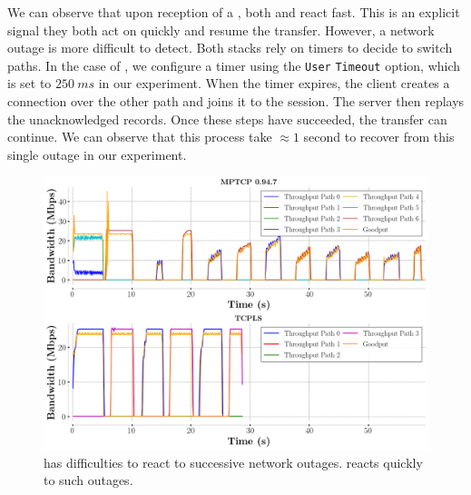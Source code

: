 We can observe that upon reception of a \tcp \rst, both
\tcpls and \mptcp react fast. This is an explicit signal they both act on 
quickly and resume the transfer. However, a network outage
is more difficult to detect. Both stacks rely on timers to decide to switch 
paths. In the case of \tcpls, we
configure a timer using the \tcp \texttt{User} \texttt{Timeout} 
option, which is set to $250~ms$ in our experiment.
When the timer expires, the client creates a connection over the other path and 
joins it to the session. The server then replays the unacknowledged records. 
Once these steps have succeeded, the transfer can continue. We can observe that 
this process take $\approx 1$ second to recover from this single outage in our 
experiment.


\begin{figure}[!t]
  \begin{center}
    \includegraphics[width=\columnwidth]{figures/tcpls_mptcp.png}
  \end{center}
\vspace{-0.5cm}
  \caption{\mptcp has difficulties to react to successive network outages. 
  \tcpls reacts quickly to such outages.}
  \label{fig:failover}
\end{figure}

